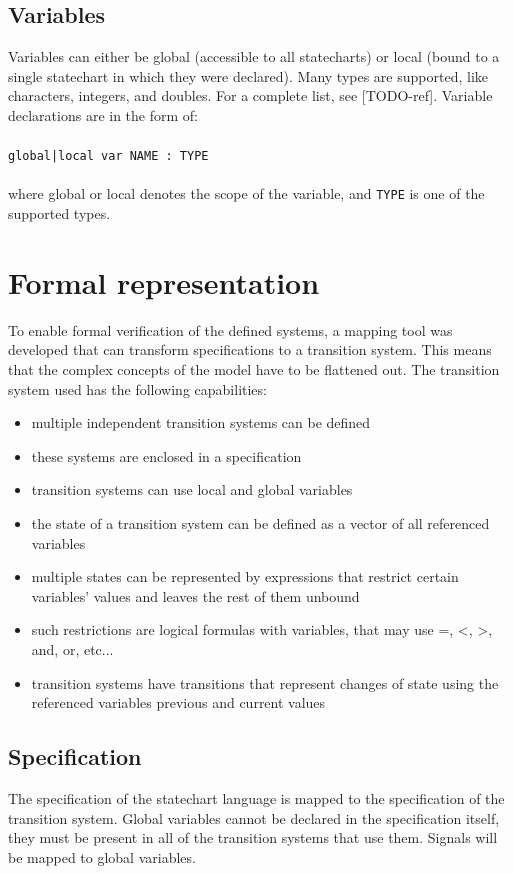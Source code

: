   \subsection{Variables}
Variables can either be global (accessible to all statecharts) or local (bound to a single statechart in which they were declared). Many types are supported, like characters, integers, and doubles. For a complete list, see [TODO-ref]. Variable declarations are in the form of:
\\\\\verb!global|local var NAME : TYPE!\\\\
where global or local denotes the scope of the variable, and \verb!TYPE! is one of the supported types.
\section{Formal representation}
To enable formal verification of the defined systems, a mapping tool was developed that can transform specifications to a transition system. This means that the complex concepts of the model have to be flattened out. The transition system used has the following capabilities:
\begin{itemize}
  \item multiple independent transition systems can be defined
  \item these systems are enclosed in a specification
  \item transition systems can use local and global variables
  \item the state of a transition system can be defined as a vector of all referenced variables
  \item multiple states can be represented by expressions that restrict certain variables' values and leaves the rest of them unbound
  \item such restrictions are logical formulas with variables, that may use =, <, >, and, or, etc...
  \item transition systems have transitions that represent changes of state using the referenced variables previous and current values
\end{itemize}
  \subsection{Specification}
The specification of the statechart language is mapped to the specification of the transition system. Global variables cannot be declared in the specification itself, they must be present in all of the transition systems that use them. Signals will be mapped to global variables.
